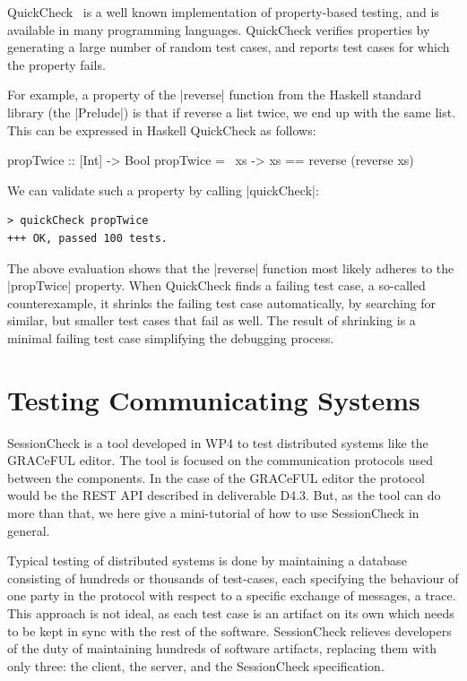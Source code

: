 \documentclass{article}
\begin{document}
QuickCheck~\cite{QuickCheck} is a well known implementation of property-based
testing, and is available in many programming languages.  QuickCheck verifies
properties by generating a large number of random test cases, and reports test
cases for which the property fails. 

For example, a property of the |reverse| function from the Haskell standard
library (the |Prelude|) is that if reverse a list twice, we end up with the same
list. This can be expressed in Haskell QuickCheck as follows:
\begin{haskellcode}
propTwice :: [Int] -> Bool
propTwice = \ xs -> xs == reverse (reverse xs)
\end{haskellcode}
We can validate such a property by calling |quickCheck|:
\begin{verbatim}
> quickCheck propTwice
+++ OK, passed 100 tests.
\end{verbatim}
The above evaluation shows that the |reverse| function most likely adheres to
the |propTwice| property. When QuickCheck finds a failing test case, a so-called
counterexample, it shrinks the failing test case automatically, by searching for
similar, but smaller test cases that fail as well. The result of shrinking is a
minimal failing test case simplifying the debugging process. 


\section{Testing Communicating Systems}
%
SessionCheck \cite{SessionCheck} is a tool developed in WP4 to test distributed systems like
the GRACeFUL editor.
%
The tool is focused on the communication protocols used between the components.
%
In the case of the GRACeFUL editor the protocol would be the REST API described in deliverable D4.3. %
%
But, as the tool can do more than that, we here give a mini-tutorial
of how to use SessionCheck in general.

Typical testing of distributed systems is done by maintaining a database consisting of hundreds
or thousands of test-cases, each specifying the behaviour of one party in the protocol with
respect to a specific exchange of messages, a trace.
%
This approach is not ideal, as each test case is an artifact on its own which needs to be kept
in sync with the rest of the software.
%
SessionCheck relieves developers of the duty of maintaining hundreds of software
artifacts, replacing them with only three: the client, the server, and the SessionCheck specification.
\end{document}
